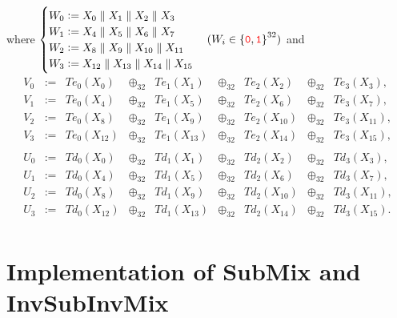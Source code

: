 where $\begin{cases}
	W_0:=X_0\parallel X_1\parallel X_2\parallel X_3\\
	W_1:=X_4\parallel X_5\parallel X_6\parallel X_7\\
	W_2:=X_8\parallel X_9\parallel X_{10}\parallel X_{11}\\
	W_3:=X_{12}\parallel X_{13}\parallel X_{14}\parallel X_{15}
\end{cases} (W_i\in\set{\textcolor{red}{\texttt{0}},\textcolor{red}{\texttt{1}}}^{32})$ and \[
\begin{array}{ccccccccc}
V_0 & := & Te_0(X_0) & \oplus_{32} & Te_1(X_1) &\oplus_{32} & Te_2(X_2) &\oplus_{32} & Te_3(X_3), \\
V_1 & := & Te_0(X_4) & \oplus_{32} & Te_1(X_5) &\oplus_{32} & Te_2(X_6) &\oplus_{32} & Te_3(X_7), \\
V_2 & := & Te_0(X_8) & \oplus_{32} & Te_1(X_9) &\oplus_{32} & Te_2(X_{10}) &\oplus_{32} & Te_3(X_{11}), \\
V_3 & := & Te_0(X_{12}) & \oplus_{32} & Te_1(X_{13}) &\oplus_{32} & Te_2(X_{14}) &\oplus_{32} & Te_3(X_{15}), \\
\\
U_0 & := & Td_0(X_0) & \oplus_{32} & Td_1(X_1) &\oplus_{32} & Td_2(X_2) &\oplus_{32} & Td_3(X_3), \\
U_1 & := & Td_0(X_4) & \oplus_{32} & Td_1(X_5) &\oplus_{32} & Td_2(X_6) &\oplus_{32} & Td_3(X_7), \\
U_2 & := & Td_0(X_8) & \oplus_{32} & Td_1(X_9) &\oplus_{32} & Td_2(X_{10}) &\oplus_{32} & Td_3(X_{11}), \\
U_3 & := & Td_0(X_{12}) & \oplus_{32} & Td_1(X_{13}) &\oplus_{32} & Td_2(X_{14}) &\oplus_{32} & Td_3(X_{15}). \\
\end{array}
\]

\newpage
\section{Implementation of SubMix and InvSubInvMix}

